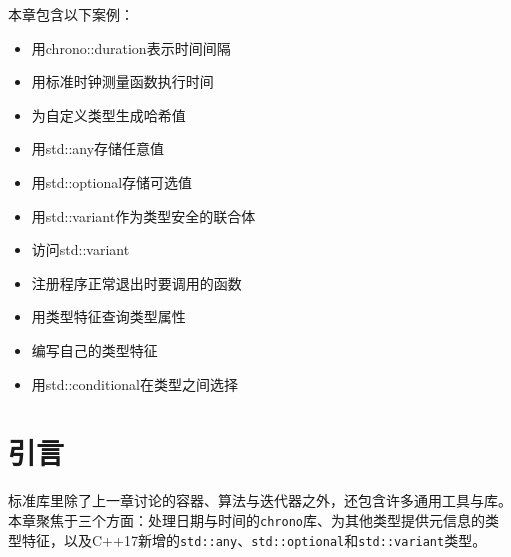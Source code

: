 
本章包含以下案例：



\begin{itemize}
\item 用chrono::duration表示时间间隔



\item 用标准时钟测量函数执行时间



\item 为自定义类型生成哈希值



\item 用std::any存储任意值



\item 用std::optional存储可选值



\item 用std::variant作为类型安全的联合体



\item 访问std::variant



\item 注册程序正常退出时要调用的函数



\item 用类型特征查询类型属性



\item 编写自己的类型特征



\item 用std::conditional在类型之间选择

\end{itemize}



\section{引言}



标准库里除了上一章讨论的容器、算法与迭代器之外，还包含许多通用工具与库。本章聚焦于三个方面：处理日期与时间的\texttt{chrono}库、为其他类型提供元信息的类型特征，以及C++17新增的\texttt{std::\allowbreak{}any}、\texttt{std::\allowbreak{}optional}和\texttt{std::\allowbreak{}variant}类型。


